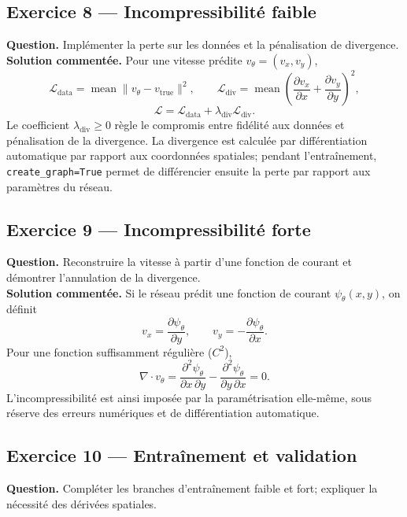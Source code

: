\documentclass[11pt,a4paper]{article}
\begin{document}
\subsection{Exercice 8 --- Incompressibilité faible}

\textbf{Question.} Implémenter la perte sur les données et la
pénalisation de divergence.
\\

\textbf{Solution commentée.} Pour une vitesse prédite
$v_\theta=(v_x,v_y)$,
\[
\mathcal L_{\mathrm{data}}
 =\operatorname{mean}\|v_\theta-v_{\mathrm{true}}\|^2,\qquad
\mathcal L_{\mathrm{div}}
 =\operatorname{mean}\left(
 \frac{\partial v_x}{\partial x}
 +\frac{\partial v_y}{\partial y}\right)^2,
\]
\[
\mathcal L=\mathcal L_{\mathrm{data}}
+\lambda_{\mathrm{div}}\mathcal L_{\mathrm{div}}.
\]
Le coefficient $\lambda_{\mathrm{div}}\geq0$ règle le compromis
entre fidélité aux données et pénalisation de la divergence.
La divergence est calculée par différentiation automatique
par rapport aux coordonnées spatiales; pendant l'entraînement,
\texttt{create\_graph=True} permet de différencier ensuite la
perte par rapport aux paramètres du réseau.

\subsection{Exercice 9 --- Incompressibilité forte}

\textbf{Question.} Reconstruire la vitesse à partir d'une fonction
de courant et démontrer l'annulation de la divergence.
\\

\textbf{Solution commentée.} Si le réseau prédit une fonction
de courant $\psi_\theta(x,y)$, on définit
\[
v_x=\frac{\partial\psi_\theta}{\partial y},
\qquad
v_y=-\frac{\partial\psi_\theta}{\partial x}.
\]
Pour une fonction suffisamment régulière ($C^2$),
\[
\nabla\cdot v_\theta
=\frac{\partial^2\psi_\theta}{\partial x\,\partial y}
-\frac{\partial^2\psi_\theta}{\partial y\,\partial x}=0.
\]
L'incompressibilité est ainsi imposée par la paramétrisation
elle-même, sous réserve des erreurs numériques et de
différentiation automatique.

\subsection{Exercice 10 --- Entraînement et validation}

\textbf{Question.} Compléter les branches d'entraînement faible
et fort; expliquer la nécessité des dérivées spatiales.
\\
\end{document}
